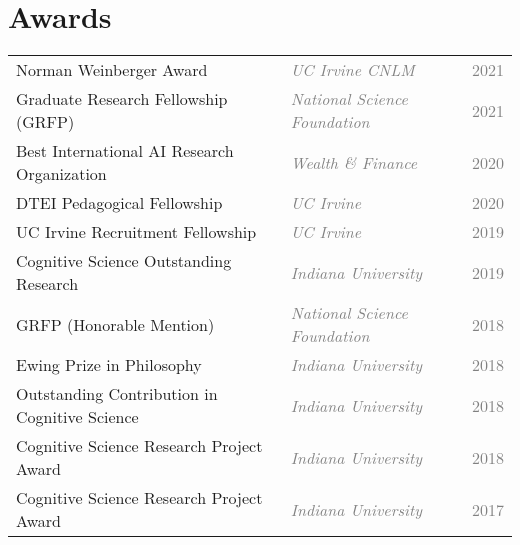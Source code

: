 \documentclass[10pt]{cooperCV2}
\begin{document}
\section{Awards}
\begin{longtable}{ l l @{\extracolsep{\fill}}  l @{}}
	 
	Norman Weinberger Award & \textit{\textcolor{gray}{UC Irvine CNLM}}  & \textcolor{grey}{2021} \\
	 
	Graduate Research Fellowship (GRFP) & \textit{\textcolor{gray}{National Science Foundation}}  & \textcolor{grey}{2021} \\
	 
	Best International AI Research Organization & \textit{\textcolor{gray}{Wealth \& Finance}}  & \textcolor{grey}{2020} \\
	 
	DTEI Pedagogical Fellowship & \textit{\textcolor{gray}{UC Irvine}}  & \textcolor{grey}{2020} \\
	 
	UC Irvine Recruitment Fellowship & \textit{\textcolor{gray}{UC Irvine}}  & \textcolor{grey}{2019} \\
	 
	Cognitive Science Outstanding Research & \textit{\textcolor{gray}{Indiana University}}  & \textcolor{grey}{2019} \\
	 
	GRFP (Honorable Mention) & \textit{\textcolor{gray}{National Science Foundation}}  & \textcolor{grey}{2018} \\
	 
	Ewing Prize in Philosophy & \textit{\textcolor{gray}{Indiana University}}  & \textcolor{grey}{2018} \\
	 
	Outstanding Contribution in Cognitive Science & \textit{\textcolor{gray}{Indiana University}}  & \textcolor{grey}{2018} \\
	 
	Cognitive Science Research Project Award & \textit{\textcolor{gray}{Indiana University}}  & \textcolor{grey}{2018} \\
	 
	Cognitive Science Research Project Award & \textit{\textcolor{gray}{Indiana University}}  & \textcolor{grey}{2017} \\
	
\end{longtable}
\end{document}
